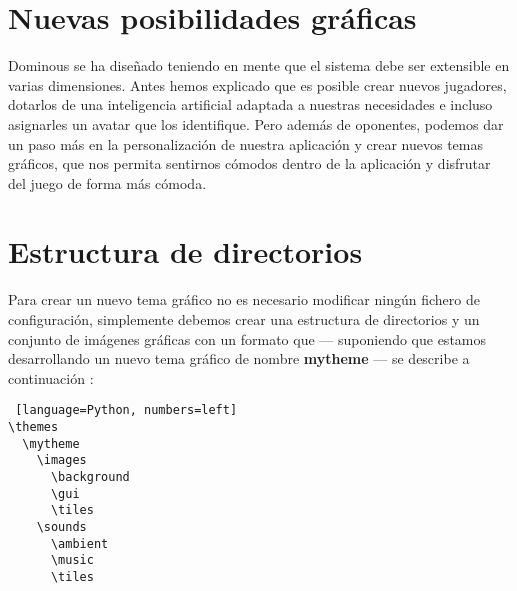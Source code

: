 


\section{Nuevas posibilidades gráficas}

Dominous se ha diseñado teniendo en mente que el sistema debe ser extensible en varias dimensiones. Antes hemos
explicado que es posible crear nuevos jugadores, dotarlos de una inteligencia artificial adaptada a nuestras necesidades
e incluso asignarles un avatar que los identifique. Pero además de oponentes, podemos dar un paso más en la
personalización de nuestra aplicación y crear nuevos temas gráficos, que nos permita sentirnos cómodos dentro de la
aplicación y disfrutar del juego de forma más cómoda. \\

\section{Estructura de directorios}

Para crear un nuevo tema gráfico no es necesario modificar ningún fichero de configuración, simplemente debemos crear una
estructura de directorios y un conjunto de imágenes gráficas con un formato que --- suponiendo que estamos desarrollando
un nuevo tema gráfico de nombre \textbf{mytheme} --- se describe a continuación :

\begin{lstlisting} [language=Python, numbers=left]
\themes
  \mytheme
    \images
      \background
      \gui
      \tiles
    \sounds
      \ambient
      \music
      \tiles
\end{lstlisting}


